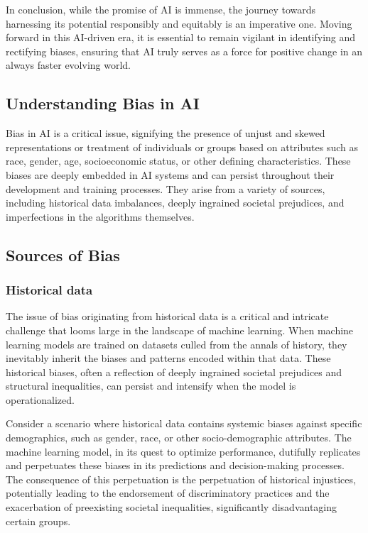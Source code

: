 \documentclass[12pt,a4paper,openright,twoside]{book}
\begin{document}
In conclusion, while the promise of AI is immense, the journey towards harnessing its potential responsibly and equitably is an imperative one. Moving forward in this AI-driven era, it is essential to remain vigilant in identifying and rectifying biases, ensuring that AI truly serves as a force for positive change in an always faster evolving world. \cite{10.1145/3308560.3317590}

\subsection{Understanding Bias in AI}

Bias in AI is a critical issue, signifying the presence of unjust and skewed representations or treatment of individuals or groups based on attributes such as race, gender, age, socioeconomic status, or other defining characteristics. These biases are deeply embedded in AI systems and can persist throughout their development and training processes. They arise from a variety of sources, including historical data imbalances, deeply ingrained societal prejudices, and imperfections in the algorithms themselves.

\subsection{Sources of Bias}

\subsubsection{Historical data} 

The issue of bias originating from historical data is a critical and intricate challenge that looms large in the landscape of machine learning. When machine learning models are trained on datasets culled from the annals of history, they inevitably inherit the biases and patterns encoded within that data. These historical biases, often a reflection of deeply ingrained societal prejudices and structural inequalities, can persist and intensify when the model is operationalized. \cite{10.1145/3308560.3317590}

Consider a scenario where historical data contains systemic biases against specific demographics, such as gender, race, or other socio-demographic attributes. The machine learning model, in its quest to optimize performance, dutifully replicates and perpetuates these biases in its predictions and decision-making processes. The consequence of this perpetuation is the perpetuation of historical injustices, potentially leading to the endorsement of discriminatory practices and the exacerbation of preexisting societal inequalities, significantly disadvantaging certain groups. 
\end{document}
